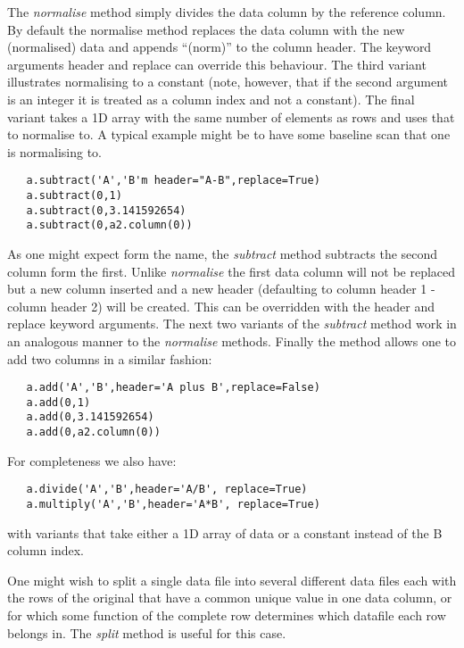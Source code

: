 \documentclass[a4paper,11pt]{scrartcl}
\begin{document}
The \textit{normalise} method simply divides the data column by the reference column. By default the normalise method replaces the data column with the new (normalised) data and appends ``(norm)'' to the column header. The keyword arguments header and replace can override this behaviour. The third variant illustrates normalising to a constant (note, however, that if the second argument is an integer it is treated as a column index and not a constant). The final variant takes a 1D array with the same number of elements as rows and uses that to normalise to. A typical example might be to have some baseline scan that one is normalising to.

\begin{lstlisting}
   a.subtract('A','B'm header="A-B",replace=True)
   a.subtract(0,1)
   a.subtract(0,3.141592654)
   a.subtract(0,a2.column(0))
\end{lstlisting}

As one might expect form the name, the \textit{subtract} method subtracts the second column form the first. Unlike \textit{normalise} the first data column will not be replaced but a new column inserted and a new header (defaulting to column header 1 - column header 2) will be created. This can be overridden with the header and replace keyword arguments. The next two variants of the \textit{subtract} method work in an analogous manner to the \textit{normalise} methods. Finally the  method allows one to add two columns in a similar fashion:

\begin{lstlisting}
   a.add('A','B',header='A plus B',replace=False)
   a.add(0,1)
   a.add(0,3.141592654)
   a.add(0,a2.column(0))
\end{lstlisting}

For completeness we also have:

\begin{lstlisting}
   a.divide('A','B',header='A/B', replace=True)
   a.multiply('A','B',header='A*B', replace=True)
\end{lstlisting}

with variants that take either a 1D array of data or a constant instead of the B column index.

One might wish to split a single data file into several different data files each with the rows of the original
that have a common unique value in one data column, or for which some function of the complete row determines which datafile
each row belongs in. The \textit{split} method is useful for this case.
\end{document}
